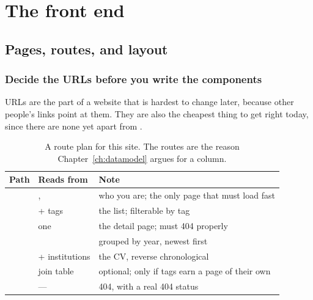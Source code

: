 \part{The front end}

\chapter{Pages, routes, and layout}
\label{ch:pages}

\section{Decide the URLs before you write the components}

URLs are the part of a website that is hardest to change later, because other people's links point
at them. They are also the cheapest thing to get right today, since there are none yet apart from
\code{/}.

\begin{table}[htbp]
\centering
\caption{A route plan for this site. The  routes are the reason
Chapter~\ref{ch:datamodel} argues for a  column.}
\label{tab:routes}
\small
\begin{tabular}{@{}L{0.24\textwidth}L{0.30\textwidth}L{0.40\textwidth}@{}}
\toprule
\textbf{Path} & \textbf{Reads from} & \textbf{Note} \\
\midrule
\code{/} & ,  & who you are; the only page that must load fast \\
 &  + tags & the list; filterable by tag \\
 & one  & the detail page; must 404 properly \\
 &  & grouped by year, newest first \\
 &  + institutions & the CV, reverse chronological \\
 & join table & optional; only if tags earn a page of their own \\
 & --- & 404, with a real 404 status \\
\bottomrule
\end{tabular}
\end{table}

